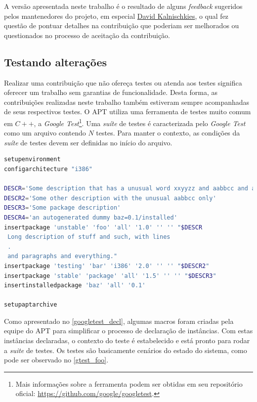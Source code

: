 A versão apresentada neste trabalho é o resultado de alguns \textit{feedback} sugeridos pelos mantenedores do projeto, em especial \href{https://github.com/DonKult}{David Kalnischkies}, o qual fez questão de pontuar detalhes na contribuição que poderiam ser melhorados ou questionados no processo de aceitação da contribuição.


\subsection*{Testando alterações} %

Realizar uma contribuição que não ofereça testes ou atenda aos testes significa oferecer um trabalho sem garantias de funcionalidade. Desta forma, as contribuições realizadas neste trabalho também estiveram sempre acompanhadas de seus respectivos testes. O {\code APT} utiliza uma ferramenta de testes muito comum em $C++$, a \textit{Google Test}\footnote{Mais informações sobre a ferramenta podem ser obtidas em seu repositório oficial: \url{https://github.com/google/googletest}.}. Uma \textit{suíte} de testes é caracterizada pelo \textit{Google Test} como um arquivo contendo $N$ testes. Para manter o contexto, as condições da \textit{suíte} de testes devem ser definidas no início do arquivo.

\begin{lstlisting}[language=Bash,label=googletest_decl,caption={Declarações de instâncias para o teste}]
setupenvironment
configarchitecture "i386"

DESCR='Some description that has a unusual word xxyyzz and aabbcc and a UPPERCASE'
DESCR2='Some other description with the unusual aabbcc only'
DESCR3='Some package description'
DESCR4='an autogenerated dummy baz=0.1/installed'
insertpackage 'unstable' 'foo' 'all' '1.0' '' '' "$DESCR
 Long description of stuff and such, with lines
 .
 and paragraphs and everything."
insertpackage 'testing' 'bar' 'i386' '2.0' '' '' "$DESCR2"
insertpackage 'stable' 'package' 'all' '1.5' '' '' "$DESCR3"
insertinstalledpackage 'baz' 'all' '0.1'

setupaptarchive
\end{lstlisting}

Como apresentado no \autoref{googletest_decl}, algumas macros foram criadas pela equipe do {\code APT} para simplificar o processo de declaração de instâncias. Com estas instâncias declaradas, o contexto do teste é estabelecido e está pronto para rodar a \textit{suite} de testes. Os testes são basicamente cenários do estado do sistema, como pode ser observado no \autoref{gtest_foo}.

